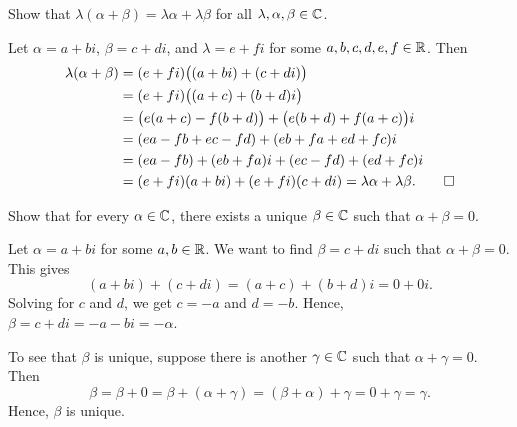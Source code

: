 \begin{exc}
\begin{exercise}
Show that $\lambda(\alpha+\beta)=\lambda\alpha+\lambda\beta$ for all
$\lambda,\alpha,\beta\in\mathbb{C}$.
\end{exercise}
\begin{solution}
Let $\alpha=a+bi$, $\beta=c+di$, and $\lambda=e+fi$ for some
$a,b,c,d,e,f\in\mathbb{R}$. Then
\begin{align*}
\lambda(\alpha+\beta) &= (e+fi)\bigl((a+bi)+(c+di)\bigr)\\
  &= (e+fi)\bigl((a+c)+(b+d)i\bigr)\\
  &= \bigl(e(a+c)-f(b+d)\bigr)+\bigl(e(b+d)+f(a+c)\bigr)i\\
  &= (ea-fb+ec-fd)+(eb+fa+ed+fc)i\\
  &= (ea-fb)+(eb+fa)i+(ec-fd)+(ed+fc)i\\
  &= (e+fi)(a+bi)+(e+fi)(c+di) = \lambda\alpha+\lambda\beta. \qedhere
\end{align*}
\end{solution}

\begin{exercise}
Show that for every $\alpha\in\mathbb{C}$, there exists a unique $\beta\in\mathbb{C}$ such that
$\alpha+\beta=0$.
\end{exercise}
\begin{solution}
Let $\alpha=a+bi$ for some $a,b\in\mathbb{R}$. We want to find $\beta=c+di$ such that
$\alpha+\beta=0$. This gives
\[ (a+bi)+(c+di) = (a+c)+(b+d)i = 0+0i. \]
Solving for $c$ and $d$, we get $c=-a$ and $d=-b$. Hence,
$\beta=c+di=-a-bi=-\alpha$.

To see that $\beta$ is unique, suppose there is another $\gamma\in\mathbb{C}$ such that
$\alpha+\gamma=0$. Then
\[ \beta=\beta+0=\beta+(\alpha+\gamma)=(\beta+\alpha)+\gamma=0+\gamma=\gamma. \]
Hence, $\beta$ is unique.
\end{solution}


\end{exc}
